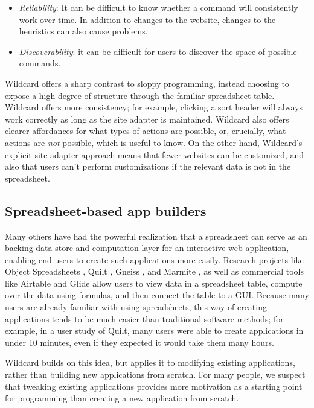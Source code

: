 \documentclass[english,submission]{programming}
\providecommand{\tightlist}{%
  \setlength{\itemsep}{0pt}\setlength{\parskip}{0pt}}
\begin{document}
\begin{itemize}
\tightlist
\item
  \emph{Reliability}: It can be difficult to know whether a command will
  consistently work over time. In addition to changes to the website,
  changes to the heuristics can also cause problems.
\item
  \emph{Discoverability}: it can be difficult for users to discover the
  space of possible commands.
\end{itemize}

Wildcard offers a sharp contrast to sloppy programming, instead choosing
to expose a high degree of structure through the familiar spreadsheet
table. Wildcard offers more consistency; for example, clicking a sort
header will always work correctly as long as the site adapter is
maintained. Wildcard also offers clearer affordances for what types of
actions are possible, or, crucially, what actions are \emph{not}
possible, which is useful to know. On the other hand, Wildcard's
explicit site adapter approach means that fewer websites can be
customized, and also that users can't perform customizations if the
relevant data is not in the spreadsheet.

\hypertarget{spreadsheet-based-app-builders}{%
\subsection{Spreadsheet-based app
builders}\label{spreadsheet-based-app-builders}}

Many others have had the powerful realization that a spreadsheet can
serve as an backing data store and computation layer for an interactive
web application, enabling end users to create such applications more
easily. Research projects like Object Spreadsheets
\autocite{mccutchen2016}, Quilt \autocite{benson2014}, Gneiss
\autocite{chang2014}, and Marmite \autocite{wong2007}, as well as
commercial tools like Airtable \autocite{zotero-79} and Glide
\autocite{zotero-81} allow users to view data in a spreadsheet table,
compute over the data using formulas, and then connect the table to a
GUI. Because many users are already familiar with using spreadsheets,
this way of creating applications tends to be much easier than
traditional software methods; for example, in a user study of Quilt,
many users were able to create applications in under 10 minutes, even if
they expected it would take them many hours.

Wildcard builds on this idea, but applies it to modifying existing
applications, rather than building new applications from scratch. For
many people, we suspect that tweaking existing applications provides
more motivation as a starting point for programming than creating a new
application from scratch.
\end{document}
